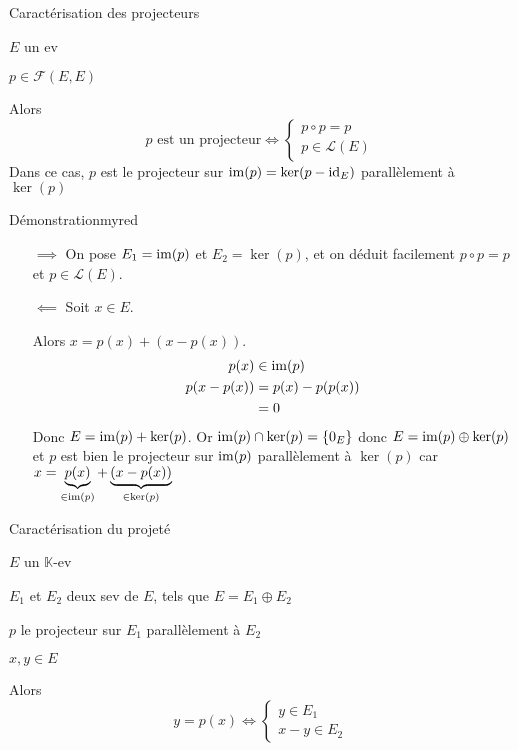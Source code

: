     \begin{theo}{Caractérisation des projecteurs}{}
        \begin{soient}
            \item $E$ un ev
            \item $p \in \mathcal{F}(E,E)$
        \end{soient}
        Alors \[ p \text{ est un projecteur} \iff \left\{ \begin{array}{l}
            p \circ p = p \\
            p \in \mathcal{L}(E)
        \end{array} \right. \]
        Dans ce cas, $p$ est le projecteur sur $\operatorname{im}(p) = \ker(p-\operatorname{id}_E)$ parallèlement à $\ker(p)$
    \end{theo}
    
    \begin{demo}{Démonstration}{myred}
        \begin{itemize}
            \item[$\implies$] On pose $E_1 = \operatorname{im}(p)$ et $E_2 = \ker(p)$, et on déduit facilement $p \circ p = p$ et $p \in \mathcal{L}(E)$.
            \item[$\impliedby$] Soit $x \in E$.
    
            Alors $x = p(x) + (x-p(x))$.
            \begin{align*}
                p(x) & \in \operatorname{im}(p) \\
                p(x-p(x)) &= p(x)-p(p(x)) \\
                 & = 0
            \end{align*} 
            Donc $E = \operatorname{im}(p) + \ker(p)$. Or $\operatorname{im}(p) \cap \ker(p) = \{ 0_E \}$ donc $E = \operatorname{im}(p) \oplus \ker(p)$ et $p$ est bien le projecteur sur $\operatorname{im}(p)$ parallèlement à $\ker(p)$ car $x = \underbrace{p(x)}_{\in \operatorname{im}(p)} + \underbrace{(x -p(x))}_{\in \ker(p)}$
        \end{itemize}
    \end{demo}
    
    \begin{prop}{Caractérisation du projeté}{}
        \begin{soient}
            \item $E$ un $\mathbb{K}$-ev
            \item $E_1$ et $E_2$ deux sev de $E$, tels que $E = E_1 \oplus E_2$
            \item $p$ le projecteur sur $E_1$ parallèlement à $E_2$
            \item $x,y \in E$
        \end{soient}
        Alors \[ y = p(x) \iff \left\{ \begin{array}{l}
            y \in E_1 \\
            x-y \in E_2
        \end{array} \right. \]
    \end{prop}
    

